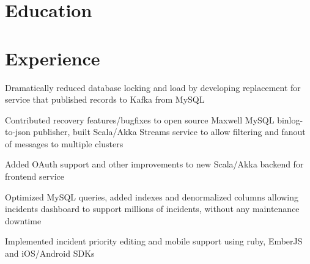 \documentclass[12pt]{jmichaud-resume}
\begin{document}
\begin{minipage}[t]{0.3\textwidth}
\vspace{20pt}

\section{Education} 




\end{minipage}
\hfill
\begin{minipage}[t]{0.65\textwidth}
\section{Experience}
 \hfill {}

\vspace{7pt}
\begin{tightemize}
	\item Dramatically reduced database locking and load by developing replacement for service that published records to Kafka from MySQL
	\item Contributed recovery features/bugfixes to open source Maxwell MySQL binlog-to-json publisher, built Scala/Akka Streams service to allow filtering and fanout of messages to multiple clusters
	\item Added OAuth support and other improvements to new Scala/Akka backend for frontend service
	
\end{tightemize}
\sectionsep
{}\hfill {}

\begin{tightemize}
	\item Optimized MySQL queries, added indexes and denormalized columns allowing incidents dashboard to support millions of incidents, without any maintenance downtime
	\item Implemented incident priority editing and mobile support using ruby, EmberJS and iOS/Android SDKs
\end{tightemize}
\sectionsep

 \hfill {}


\end{minipage}
\end{document}
